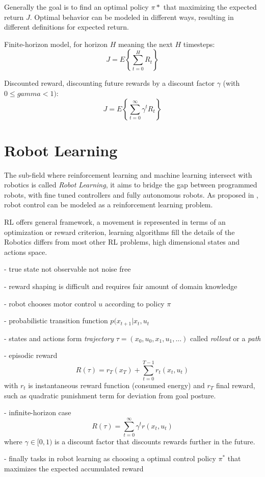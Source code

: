 Generally the goal is to find an optimal policy $\pi*$ that
maximizing the expected return $J$.
Optimal behavior can be modeled in different ways, resulting in different
definitions for expected return.

Finite-horizon model, for horizon $H$ meaning the next $H$ timesteps:
$$ J = E \left\{\sum^H_{t=0} R_t \right\} $$

Discounted reward, discounting future rewards by a discount factor $\gamma$
(with $0 \leq gamma < 1)$:
$$ J = E \left\{\sum^{\infty}_{t=0} \gamma^t R_t \right\} $$


\section{Robot Learning}
The sub-field where reinforcement learning and machine learning
intersect with robotics is called \textit{Robot Learning}, it aims to bridge
the gap between programmed robots,
with fine tuned controllers  and fully autonomous robots.
As proposed in \citet{deisenroth2013survey}, robot control can be modeled as
a reinforcement learning problem.

RL offers general framework, a movement is represented in terms of an optimization or
reward criterion, learning algorithms fill the details of the
Robotics differs from most other RL problems, high dimensional states and actions space.

- true state not observable not noise free

- reward shaping is difficult and requires fair amount of domain knowledge

- robot chooses motor control $u$ according to policy $\pi$

- probabilistic transition function $p(x_{t+1} | x_t, u_t$

- states and actions form \textit{trajectory} $\tau = (x_0, u_0, x_1, u_1,...)$
called \textit{rollout} or a \textit{path}

- episodic reward
$$ R(\tau) = r_T(x_T) + \sum^{T-1}_{t=0} r_t(x_t,u_t) $$
with $r_t$ is instantaneous reward function (consumed energy) and
$r_T$ final reward, such as quadratic punishment term for deviation from goal posture.

- infinite-horizon case
$$ R(\tau) = \sum^{\infty}_{t=0} \gamma^t r(x_t, u_t) $$
where $\gamma \in [0,1)$ is a discount factor that discounts rewards further in the future.

- finally tasks in robot learning as choosing a optimal control policy $\pi^*$ that
maximizes the expected accumulated reward

